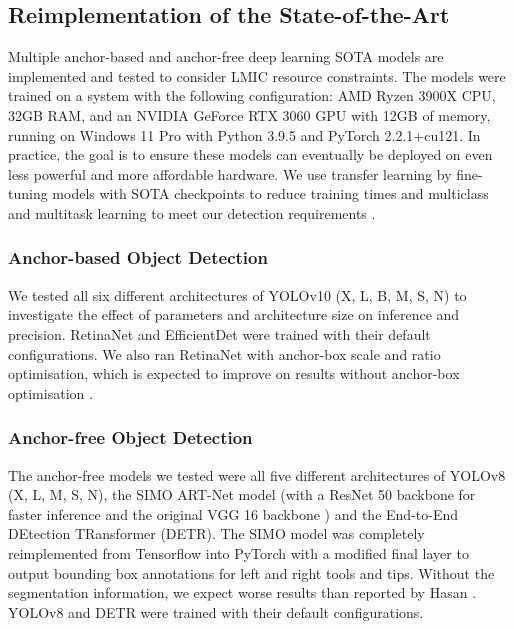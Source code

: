 \subsection{Reimplementation of the State-of-the-Art}

Multiple anchor-based and anchor-free deep learning SOTA models are implemented and tested to consider LMIC resource constraints. The models were trained on a system with the following configuration: AMD Ryzen 3900X CPU, 32GB RAM, and an NVIDIA GeForce RTX 3060 GPU with 12GB of memory, running on Windows 11 Pro with Python 3.9.5 and PyTorch 2.2.1+cu121. In practice, the goal is to ensure these models can eventually be deployed on even less powerful and more affordable hardware. We use transfer learning by fine-tuning models with SOTA checkpoints to reduce training times and multiclass and multitask learning to meet our detection requirements \cite{alabi_multitask_2024}.

\subsubsection{Anchor-based Object Detection}

We tested all six different architectures of YOLOv10 (X, L, B, M, S, N) to investigate the effect of parameters and architecture size on inference and precision. RetinaNet and EfficientDet were trained with their default configurations. We also ran RetinaNet with anchor-box scale and ratio optimisation, which is expected to improve on results without anchor-box optimisation \cite{zlocha_improving_2019}.

\subsubsection{Anchor-free Object Detection}

The anchor-free models we tested were all five different architectures of YOLOv8 (X, L, M, S, N), the SIMO ART-Net model (with a ResNet 50 backbone for faster inference \cite{koonce_resnet_2021} and the original VGG 16 backbone \cite{hasan_detection_2021}) and the End-to-End DEtection TRansformer (DETR). The SIMO model was completely reimplemented from Tensorflow into PyTorch with a modified final layer to output bounding box annotations for left and right tools and tips. Without the segmentation information, we expect worse results than reported by Hasan \cite{hasan_detection_2021}. YOLOv8 and DETR were trained with their default configurations.

